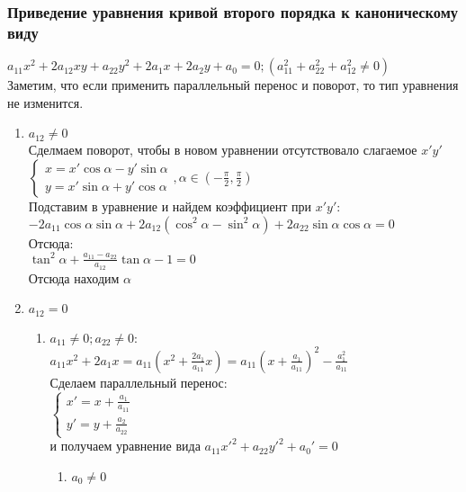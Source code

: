 \documentclass[12pt]{article}
\begin{document}
    \subsubsection{Приведение уравнения кривой второго порядка к каноническому виду}
    $a_{11}x^2+2a_{12}xy+a_{22}y^2+2a_1x+2a_2y+a_0 = 0; (a_{11}^2+a_{22}^2+a_{12}^2\neq 0)$\\
    Заметим, что если применить параллельный перенос и поворот, то тип уравнения не изменится.
    \begin{enumerate}
        \item $a_{12} \neq 0$\\
         Сделмаем поворот, чтобы в новом уравнении отсутствовало слагаемое $x'y'$\\
         $\left\{\begin{array}{l}
              x=x'\cos \alpha - y'\sin \alpha  \\
              y = x'\sin \alpha + y'\cos\alpha
         \end{array}\right., \alpha \in (-\frac \pi2, \frac \pi2)$\\
         Подставим в уравнение и найдем коэффициент при $x'y'$:\\
         $-2a_{11}\cos\alpha\sin\alpha+2a_{12}(\cos^2\alpha-\sin^2\alpha)+2a_{22}\sin\alpha\cos\alpha=0$\\
         Отсюда:\\
         $\tan^2\alpha+\frac{a_{11}-a_{22}}{a_{12}}\tan\alpha-1=0$\\
         Отсюда находим $\alpha$
         \item $a_{12} = 0$
         \begin{enumerate}
             \item $a_{11}\neq 0; a_{22}\neq0$:\\
             $a_{11}x^2+2a_1x=a_{11}(x^2+\frac{2a_1}{a_{11}}x)=a_{11}(x+\frac{a_1}{a_{11}})^2-\frac{a_1^2}{a_{11}}$\\
             Сделаем параллельный перенос:\\
             $\left\{\begin{array}{l}
              x' = x + \frac{a_1}{a_{11}}\\
              y' = y + \frac{a_2}{a_{22}}
            \end{array}\right.$\\
            и получаем уравнение вида $a_{11}x'^2+a_{22}y'^2+a_0'=0$
            \begin{enumerate}
                \item $a_0 \neq 0$\\

\end{enumerate}
\end{enumerate}
\end{enumerate}
\end{document}
